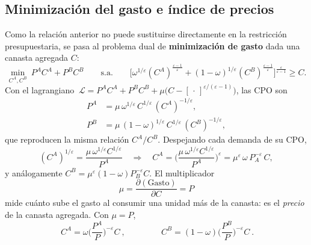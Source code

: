 \documentclass[11pt]{article}
\renewcommand{\boxed}[1]{#1}     %
\theoremstyle{definition}
\begin{document}
\subsection{Minimización del gasto e índice de precios}

Como la relación anterior no puede sustituirse directamente en la restricción presupuestaria, se
pasa al problema dual de \textbf{minimización de gasto} dada una canasta agregada $C$:
\begin{equation}
\min_{C^{A},C^{B}}\ P^{A}C^{A}+P^{B}C^{B}
\qquad\text{s.a.}\qquad
\Big[\omega^{1/\varepsilon}(C^{A})^{\frac{\varepsilon-1}{\varepsilon}}
+(1-\omega)^{1/\varepsilon}(C^{B})^{\frac{\varepsilon-1}{\varepsilon}}\Big]^{\frac{\varepsilon}{\varepsilon-1}}\ge C .
\end{equation}
Con el lagrangiano $\ \mathcal{L}=P^{A}C^{A}+P^{B}C^{B}+\mu\big(C-[\,\cdot\,]^{\varepsilon/(\varepsilon-1)}\big)$, las CPO son
\begin{align}
P^{A}&=\mu\,\omega^{1/\varepsilon}\,C^{1/\varepsilon}\,(C^{A})^{-1/\varepsilon}, \\
P^{B}&=\mu\,(1-\omega)^{1/\varepsilon}\,C^{1/\varepsilon}\,(C^{B})^{-1/\varepsilon},
\end{align}
que reproducen la misma relación $C^{A}/C^{B}$. Despejando cada demanda de su CPO,
\begin{equation}
(C^{A})^{1/\varepsilon}=\frac{\mu\,\omega^{1/\varepsilon}C^{1/\varepsilon}}{P^{A}}
\quad\Longrightarrow\quad
C^{A}=\Big(\frac{\mu\,\omega^{1/\varepsilon}C^{1/\varepsilon}}{P^{A}}\Big)^{\!\varepsilon}
=\mu^{\varepsilon}\,\omega\,P_{A}^{-\varepsilon}\,C ,
\end{equation}
y análogamente $C^{B}=\mu^{\varepsilon}(1-\omega)P_{B}^{-\varepsilon}C$. El multiplicador
\begin{equation}
\mu=\frac{\partial(\text{Gasto})}{\partial C}=P
\end{equation}
mide cuánto sube el gasto al consumir una unidad más de la canasta: es el \emph{precio} de la
canasta agregada. Con $\mu=P$,
\begin{equation}
\boxed{\ C^{A}=\omega\Big(\frac{P^{A}}{P}\Big)^{-\varepsilon}C\ },
\qquad\qquad
\boxed{\ C^{B}=(1-\omega)\Big(\frac{P^{B}}{P}\Big)^{-\varepsilon}C\ }.
\end{equation}
\end{document}
